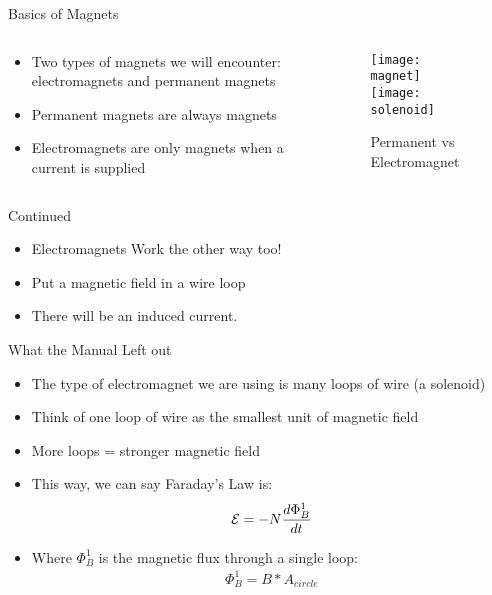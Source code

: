 \documentclass{beamer}
\begin{document}
\begin{frame}{Basics of Magnets}
  \begin{columns}
    \begin{column}{0.5\textwidth}
      \begin{itemize}
      \item Two types of magnets we will encounter: electromagnets and  permanent magnets
      \item Permanent magnets are always magnets
      \item Electromagnets are only magnets when a current is supplied
      \end{itemize}
    \end{column}
    \begin{column}{0.5\textwidth}
      \begin{figure}[H]
        \centering
        \texttt{[image: magnet]}
        \texttt{[image: solenoid]}
        \caption{Permanent vs Electromagnet}
      \end{figure}
    \end{column}
  \end{columns}
\end{frame}

\begin{frame}{Continued}
  \begin{itemize}
  \item Electromagnets Work the other way too!
  \item Put a magnetic field in a wire loop
  \item There will be an induced current. 
  \end{itemize}
\end{frame}

\begin{frame}{What the Manual Left out}
  \begin{itemize}
  \item The type of electromagnet we are using is many loops of wire (a solenoid)
  \item Think of one loop of wire as the smallest unit of magnetic field
  \item More loops = stronger magnetic field
  \item This way, we can say Faraday's Law is:
    \begin{align*}
      \mathcal{E}=-N\dv{\Phi^1_{B}}{t}
    \end{align*}
  \item Where $\Phi_B^1$ is the magnetic flux through a single loop:
    \begin{align*}
      \Phi_B^1=B*A_{circle}
    \end{align*}
  \end{itemize}
\end{frame}
\end{document}
